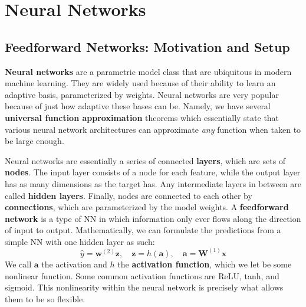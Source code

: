 \documentclass[11pt, letterpaper]{article}
\theoremstyle{definition}
\theoremstyle{plain}
\begin{document}
\section{Neural Networks}

\subsection{Feedforward Networks: Motivation and Setup}

\textbf{Neural networks} are a parametric model class that are ubiquitous in modern machine learning. They are widely used because of their ability to learn an adaptive basis, parameterized by weights. Neural networks are very popular because of just how adaptive these bases can be. Namely, we have several \textbf{universal function approximation} theorems which essentially state that various neural network architectures can approximate \textit{any} function when taken to be large enough. 


Neural networks are essentially a series of connected \textbf{layers}, which are sets of \textbf{nodes}. The input layer consists of a node for each feature, while the output layer has as many dimensions as the target has. Any intermediate layers in between are called \textbf{hidden layers}. Finally, nodes are connected to each other by \textbf{connections}, which are parameterized by the model weights. A \textbf{feedforward network} is a type of NN in which information only ever flows along the direction of input to output. Mathematically, we can formulate the predictions from a simple NN with one hidden layer as such:
\[
\hat y = \bm w^{(2)}\bm z, \quad \bm z = h\left(\bm a\right), \quad \bm a = \bm{W}^{(1)}\bm x
\]
We call $\bm a$ the activation and $h$ the \textbf{activation function}, which we let be some nonlinear function. Some common activation functions are ReLU, tanh, and sigmoid. This nonlinearity within the neural network is precisely what allows them to be so flexible. 
\end{document}
